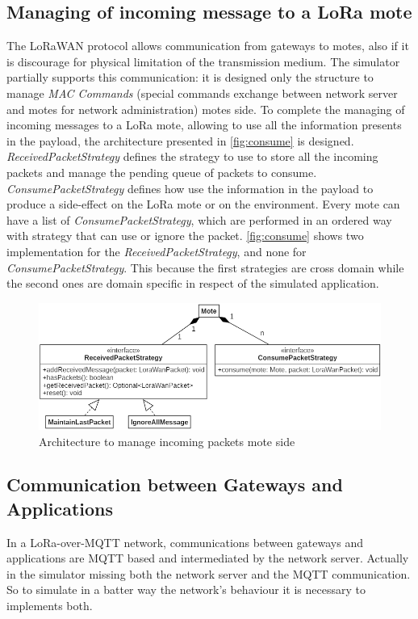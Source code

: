 \subsection{Managing of incoming message to a LoRa mote}
The LoRaWAN protocol allows communication from gateways to motes, also if it is discourage for physical limitation of the transmission medium. 
The simulator partially supports this communication: it is designed only the structure to manage \textit{MAC Commands} (special commands exchange between network server and motes for network administration) motes side.
To complete the managing of incoming messages to a LoRa mote, allowing to use all the information presents in the payload, the architecture presented in \autoref{fig:consume} is designed.
\mbox{\textit{ReceivedPacketStrategy}} defines the strategy to use to store all the incoming packets and manage the pending queue of packets to consume.
\mbox{\textit{ConsumePacketStrategy}} defines how use the information in the payload to produce a side-effect on the LoRa mote or on the environment. 
Every mote can have a list of \mbox{\textit{ConsumePacketStrategy}}, which are performed in an ordered way with strategy that can use or ignore the packet.
\autoref{fig:consume} shows two implementation for the \mbox{\textit{ReceivedPacketStrategy}}, and none for \mbox{\textit{ConsumePacketStrategy}}. This because the first strategies are cross domain while the second ones are domain specific in respect of the simulated application.
\begin{figure}[h]
    \centering
    \includegraphics[width=\textwidth]{figures/consumePacket.png}
    \caption{Architecture to manage incoming packets mote side}
    \label{fig:consume}
\end{figure}

\subsection{Communication between Gateways and Applications}
In a LoRa-over-MQTT network, communications between gateways and applications are MQTT based and intermediated by the network server.
Actually in the simulator missing both the network server and the MQTT communication. 
So to simulate in a batter way the network's behaviour it is necessary to implements both.

